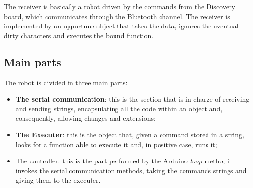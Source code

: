 The receiver is basically a robot driven by the commands from the Discovery board, which communicates through the Bluetooth channel. The receiver is implemented by an opportune object that takes the data, ignores the eventual dirty characters and executes the bound function.

\subsection{Main parts}
The robot is divided in three main parts:
\begin{itemize}
	\item \textbf{The serial communication}: this is the section that is in charge of receiving and sending strings, encapsulating all the code within an object and, consequently, allowing changes and extensions;
	\item \textbf{The Executer}: this is the object that, given a command stored in a string, looks for a function able to execute it and, in positive case, runs it;
	\item The controller: this is the part performed by the Arduino \textit{loop} metho; it invokes the serial communication methods, taking the commands strings and giving them to the executer.
\end{itemize}

